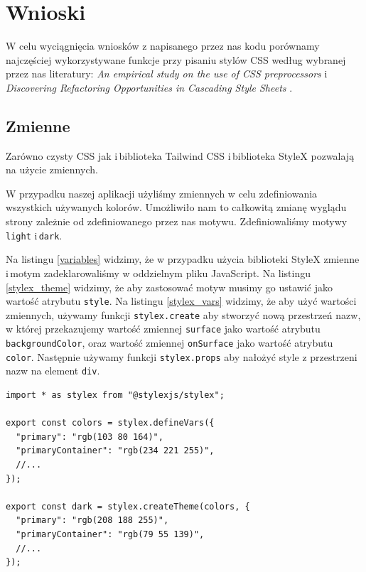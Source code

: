 \documentclass[a4paper,12pt]{book} %
\begin{document}
\chapter{Wnioski}
W celu wyciągnięcia wniosków z napisanego przez nas kodu porównamy najczęściej wykorzystywane funkcje przy pisaniu stylów CSS według wybranej przez nas literatury: \emph{An empirical study on the use of CSS preprocessors} \cite{Mazinanian__Tsantalis__2016} i\,\emph{Discovering Refactoring Opportunities in Cascading Style Sheets} \cite{Mazinanian__Tsantalis__2}.

\section{Zmienne}
Zarówno czysty CSS jak i\,biblioteka Tailwind CSS i\,biblioteka StyleX pozwalają na użycie zmiennych.

W przypadku naszej aplikacji użyliśmy zmiennych w celu zdefiniowania wszystkich używanych kolorów. Umożliwiło nam to całkowitą zmianę wyglądu strony zależnie od zdefiniowanego przez nas motywu. Zdefiniowaliśmy motywy \lstinline|light| i\,\lstinline|dark|.




Na listingu \ref{variables} widzimy, że w przypadku użycia biblioteki StyleX zmienne i\,motym zadeklarowaliśmy w oddzielnym pliku JavaScript. Na listingu \ref{stylex_theme} widzimy, że aby zastosować motyw musimy go ustawić jako wartość atrybutu \lstinline|style|. Na listingu \ref{stylex_vars} widzimy, że aby użyć wartości zmiennych, używamy funkcji \lstinline|stylex.create| aby stworzyć nową przestrzeń nazw, w której przekazujemy wartość zmiennej \lstinline|surface| jako wartość atrybutu \lstinline|backgroundColor|, oraz wartość zmiennej \lstinline|onSurface| jako wartość atrybutu \lstinline|color|. Następnie używamy funkcji \lstinline|stylex.props| aby nałożyć style z przestrzeni nazw na element \lstinline|div|.

\begin{lstfloat}[hb]
  \lstset{language=HTML}
  \begin{lstlisting}[frame=single]
import * as stylex from "@stylexjs/stylex";

export const colors = stylex.defineVars({
  "primary": "rgb(103 80 164)",
  "primaryContainer": "rgb(234 221 255)",
  //...
});

export const dark = stylex.createTheme(colors, {
  "primary": "rgb(208 188 255)",
  "primaryContainer": "rgb(79 55 139)",
  //...
});
\end{lstlisting}
  \caption{StyleX definicja zmiennych CSS}\label{variables}
\end{lstfloat}
\end{document}
